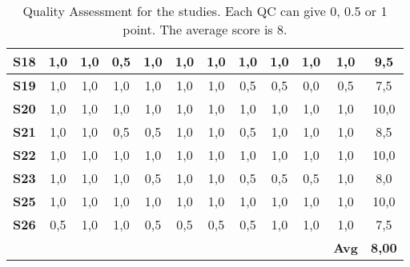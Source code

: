 \begin{table}
\begin{tabular}{|c|c|c|c|c|c|c|c|c|c|c||c|}
    \textbf{S18} & 1,0 & 1,0 & 0,5 & 1,0 & 1,0 & 1,0 & 1,0 & 1,0 & 1,0 & 1,0 & 9,5 \\ \hline
    \textbf{S19} & 1,0 & 1,0 & 1,0 & 1,0 & 1,0 & 1,0 & 0,5 & 0,5 & 0,0 & 0,5 & 7,5 \\ \hline
    \textbf{S20} & 1,0 & 1,0 & 1,0 & 1,0 & 1,0 & 1,0 & 1,0 & 1,0 & 1,0 & 1,0 & 10,0 \\ \hline
    \textbf{S21} & 1,0 & 1,0 & 0,5 & 0,5 & 1,0 & 1,0 & 0,5 & 1,0 & 1,0 & 1,0 & 8,5 \\ \hline
    \textbf{S22} & 1,0 & 1,0 & 1,0 & 1,0 & 1,0 & 1,0 & 1,0 & 1,0 & 1,0 & 1,0 & 10,0 \\ \hline
    \textbf{S23} & 1,0 & 1,0 & 1,0 & 0,5 & 1,0 & 1,0 & 0,5 & 0,5 & 0,5 & 1,0 & 8,0 \\ \hline
    \textbf{S25} & 1,0 & 1,0 & 1,0 & 1,0 & 1,0 & 1,0 & 1,0 & 1,0 & 1,0 & 1,0 & 10,0 \\ \hline
    \textbf{S26} & 0,5 & 1,0 & 1,0 & 0,5 & 0,5 & 0,5 & 0,5 & 1,0 & 1,0 & 1,0 & 7,5 \\ \hline
     &  &  &  &  &  &  &  &  &  & \textbf{Avg} & \textbf{8,00} \\ \hline
    
    \end{tabular}
    
    \caption{Quality Assessment for the studies. Each QC can give 0, 0.5 or 1 point. The average score is 8.}
\end{table}